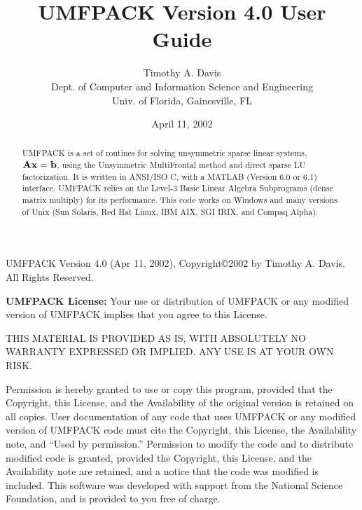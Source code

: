 
\newcommand{\m}[1]{{\bf{#1}}}       %
\newcommand{\tr}{^{\sf T}}          %


\author{Timothy A. Davis \\
Dept. of Computer and Information Science and Engineering \\
Univ. of Florida, Gainesville, FL}
\title{UMFPACK Version 4.0 User Guide}
\date{April 11, 2002}
\maketitle

\begin{abstract}
    UMFPACK is a set of routines for solving unsymmetric sparse linear
    systems, $\m{Ax}=\m{b}$, using the Unsymmetric MultiFrontal method
    and direct sparse LU factorization.  It is written in ANSI/ISO C, with a
    MATLAB (Version 6.0 or 6.1) interface.  UMFPACK relies on the Level-3 Basic
    Linear Algebra Subprograms (dense matrix multiply) for its performance.
    This code works on Windows and many versions of Unix (Sun Solaris,
    Red Hat Linux, IBM AIX, SGI IRIX, and Compaq Alpha).
\end{abstract}

UMFPACK Version 4.0 (Apr 11, 2002), Copyright\copyright 2002 by Timothy A.
Davis.  All Rights Reserved.

{\bf UMFPACK License:}
    Your use or distribution of UMFPACK or any modified version of
    UMFPACK implies that you agree to this License.

    THIS MATERIAL IS PROVIDED AS IS, WITH ABSOLUTELY NO WARRANTY
    EXPRESSED OR IMPLIED.  ANY USE IS AT YOUR OWN RISK.

    Permission is hereby granted to use or copy this program, provided
    that the Copyright, this License, and the Availability of the original
    version is retained on all copies.  User documentation of any code that
    uses UMFPACK or any modified version of UMFPACK code must cite the
    Copyright, this License, the Availability note, and ``Used by permission.''
    Permission to modify the code and to distribute modified code is granted,
    provided the Copyright, this License, and the Availability note are
    retained, and a notice that the code was modified is included.  This
    software was developed with support from the National Science Foundation,
    and is provided to you free of charge.

